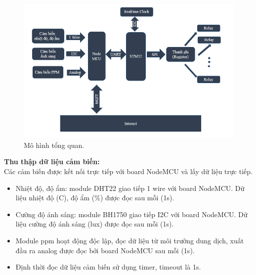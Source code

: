 \documentclass[a4paper,12pt,oneside]{article}
\begin{document}
\begin{figure}[H]
	\centering
	\includegraphics[scale=.85]{hinh/mohinh.png}
	\caption{Mô hình tổng quan.}
\end{figure}


\noindent \textbf{Thu thập dữ liệu cảm biến:}\\
\noindent Các cảm biến được kết nối trực tiếp với board NodeMCU và lấy dữ liệu trực tiếp.
\begin{itemize}
	\item Nhiệt độ, độ ẩm: module DHT22 giao tiếp 1 wire với board NodeMCU. Dữ liệu nhiệt độ (C), độ ẩm (\%) được đọc sau mỗi (1s).
	\item Cường độ ánh sáng: module BH1750 giao tiếp I2C với board NodeMCU. Dữ liệu cường độ ánh sáng (lux) được đọc sau mỗi (1s).
	\item Module ppm hoạt động độc lập, đọc dữ liệu từ môi trường dung dịch, xuất đầu ra analog được đọc bởi board NodeMCU sau mỗi (1s).
	\item Định thời đọc dữ liệu cảm biến sử dụng timer, timeout là 1s.
\end{itemize}
\end{document}
